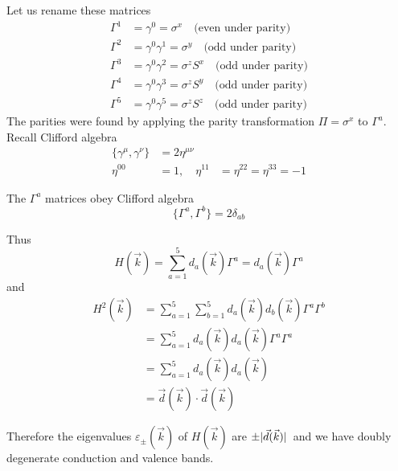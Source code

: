 \documentclass[12pt,a4paper,titlepage]{article}
\newcommand{\trm}[1]{\textrm{#1}} %
\begin{document}
Let us rename these matrices
\begin{equation}
\begin{aligned}
\Gamma^{1}&=\gamma^{0}=\sigma^{x}\quad\trm{(even under parity)}\\
\Gamma^{2}&=\gamma^{0}\gamma^{1}=\sigma^{y}\quad\trm{(odd under parity)}\\
\Gamma^{3}&=\gamma^{0}\gamma^{2}=\sigma^{z}S^{x}\quad\trm{(odd under parity)}\\
\Gamma^{4}&=\gamma^{0}\gamma^{3}=\sigma^{z}S^{y}\quad\trm{(odd under parity)}\\
\Gamma^{5}&=\gamma^{0}\gamma^{5}=\sigma^{z}S^{z}\quad\trm{(odd under parity)}
\end{aligned}
\end{equation}
The parities were found by applying the parity transformation $\Pi=\sigma^{x}$ to $\Gamma^{a}$.\\

Recall Clifford algebra
\begin{equation}
\begin{aligned}
\{\gamma^{\mu},\gamma^{\nu}\}&=2\eta^{\mu\nu}\\
\eta^{00}&=1,\quad\eta^{11}&=\eta^{22}=\eta^{33}=-1
\end{aligned}
\end{equation}

The $\Gamma^{a}$ matrices obey Clifford algebra
\begin{equation}
\{\Gamma^{a},\Gamma^{b}\}=2\delta_{ab}
\end{equation}

Thus
\begin{equation}
H(\vec{k})=\sum_{a=1}^{5}d_{a}(\vec{k})\Gamma^{a}=d_{a}(\vec{k})\Gamma^{a}
\end{equation}
and
\begin{equation}
\begin{aligned}
H^{2}(\vec{k})&=\sum_{a=1}^{5}\sum_{b=1}^{5}d_{a}(\vec{k})d_{b}(\vec{k})\Gamma^{a}\Gamma^{b}\\
&=\sum_{a=1}^{5}d_{a}(\vec{k})d_{a}(\vec{k})\Gamma^{a}\Gamma^{a}\\
&=\sum_{a=1}^{5}d_{a}(\vec{k})d_{a}(\vec{k})\\
&=\vec{d}(\vec{k})\cdot\vec{d}(\vec{k})
\end{aligned}
\end{equation}

Therefore the eigenvalues $\varepsilon_{\pm}(\vec{k})$ of $H(\vec{k})$ are $\pm\abs*{\vec{d}(\vec{k})}$ and we have doubly degenerate conduction and valence bands.\\
\end{document}
